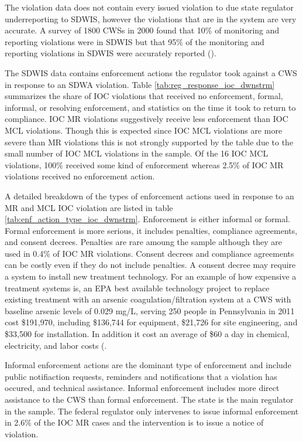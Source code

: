 \documentclass{article}
\begin{document}
The violation data does not contain every issued violation to due state regulator underreporting to SDWIS, however the violations that are in the system are very accurate. A survey of 1800 CWSs in 2000 found that 10\% of monitoring and reporting violations were in SDWIS but that 95\% of the monitoring and reporting violations in SDWIS were accurately reported (\cite{epaviolationreliability}).

The SDWIS data contains enforcement actions the regulator took against a CWS in response to an SDWA violation. Table \ref{tab:reg_response_ioc_dwnstrm} summarizes the share of IOC violations that received no enforcement, formal, informal, or resolving enforcement, and statistics on the time it took to return to compliance. IOC MR violations suggestively receive less enforcement than IOC MCL violations. Though this is expected since IOC MCL violations are more severe than MR violations this is not strongly supported by the table due to the small number of IOC MCL violations in the sample. Of the 16 IOC MCL violations, 100\% received some kind of enforcement whereas 2.5\% of IOC MR violations received no enforcement action.

A detailed breakdown of the types of enforcement actions used in response to an MR and MCL IOC violation are listed in table \ref{tab:enf_action_type_ioc_dwnstrm}. Enforcement is either informal or formal. Formal enforcement is more serious, it includes penalties, compliance agreements, and consent decrees. Penalties are rare amoung the sample although they are used in 0.4\% of IOC MR violations. Consent decrees and compliance agreements can be costly even if they do not include penalties. A consent decree may require a system to install new treatment technology. For an example of how expensive a treatment systems is, an EPA best available technology project to replace existing treatment with an arsenic coagulation/filtration system at a CWS with baseline arsenic levels of 0.029 mg/L, serving 250 people in Pennsylvania in 2011 cost \$191,970, including \$136,744 for equipment, \$21,726 for site engineering, and \$33,500 for installation. In addition it cost an average of \$60 a day in chemical, electricity, and labor costs (\cite{epaarsenicbat)}.

Informal enforcement actions are the dominant type of enforcement and include public notifiaction requests, reminders and notifications that a violation has occured, and technical assistance. Informal enforcement includes more direct assistance to the CWS than formal enforcement. The state is the main regulator in the sample. The federal regulator only intervenes to issue informal enforcement in 2.6\% of the IOC MR cases and the intervention is to issue a notice of violation. 
\end{document}

